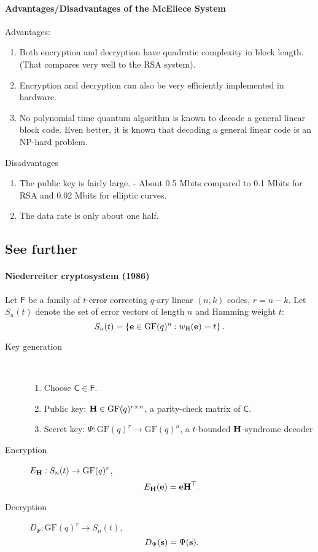 \documentclass[a4paper, 11pt, openany]{book}
\numberwithin{equation}{section}
\theoremstyle{plain}
\theoremstyle{definition}
\newcommand{\GF}{\mathrm{GF}}
\newcommand{\wH}{w_\mathrm{H}}
\newcommand{\code}[1]{\mathsf{#1}}
\begin{document}
\paragraph{Advantages/Disadvantages of the McEliece System}
Advantages:
\begin{enumerate}
\item Both encryption and decryption have quadratic
complexity in block length. (That compares very well to the RSA
system).

\item Encryption and decryption can also be very efficiently implemented in hardware.

\item No polynomial time quantum algorithm is known to
decode a general linear block code. Even better, it is known
that decoding a general linear code is an NP-hard
problem.
\end{enumerate}

Disadvantages
\begin{enumerate}
	\item The public key is fairly large. - About 0.5 Mbits compared to 0.1 Mbits for RSA and 0.02 Mbits for elliptic curves.

	\item The data rate is only about one half.
\end{enumerate}


\subsection{See further}

\paragraph{Niederreiter cryptosystem (1986)}
Let $\code{F}$ be a family of $t$-error correcting $q$-ary linear $(n,k)$ codes, $r = n-k$. Let $S_n(t)$ denote the set of error vectors of length $n$ and Hamming weight $t$: 
\[
    S_n(t) = \left\{ {\bf e} \in \GF(q)^n : \wH({\bf e}) = t \right\}.
\]

\begin{description}
\item[Key generation]~
\begin{enumerate}
    \item Choose $\code{C} \in \code{F}$.
    
    \item Public key: ${\bf H} \in \GF(q)^{r \times n}$, a parity-check matrix of $\code{C}$.

    \item Secret key: $\Psi : \GF(q)^r \to \GF(q)^n$, a $t$-bounded ${\bf H}$-syndrome decoder
\end{enumerate}


\item[Encryption] $E_{\bf H} : S_n(t) \to \GF(q)^r$, 
\[
    E_{\bf H}( {\bf e} ) = {\bf e} {\bf H}^\top.
\]

\item[Decryption] $D_\Psi : \GF(q)^r \to S_n(t)$,
\[
    D_\Psi( {\bf s}) = \Psi({\bf s}).
\]

\end{description}
\end{document}
